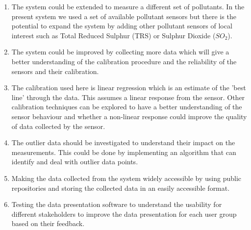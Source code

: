 \begin{enumerate}

    \item The system could be extended to measure a different set of pollutants. In the present system we used a set of available pollutant sensors but there is the potential to expand the system by adding other pollutant sensors of local interest such as Total Reduced Sulphur (TRS) or Sulphur Dioxide ($SO_{2}$).
      
    \item The system could be improved by collecting more data which will give a better understanding of the calibration procedure and the reliability of the sensors and their calibration.

    
    \item The calibration used here is linear regression which is an estimate of the 'best line' through the data. This assumes a linear response from the sensor. Other calibration techniques can be explored to have a better understanding of the sensor behaviour and whether a non-linear response could improve the quality of data collected by the sensor.
   
    \item The outlier data should be investigated to understand their impact on the measurements. This could be done by implementing an algorithm that can identify and deal with outlier data points.
    
    \item  Making the data collected from the system widely accessible by using public repositories and storing the collected data in an easily accessible format.
    
    \item Testing the data presentation software to understand the usability for different stakeholders to improve the data presentation for each user group based on their feedback.
    



\end{enumerate}

